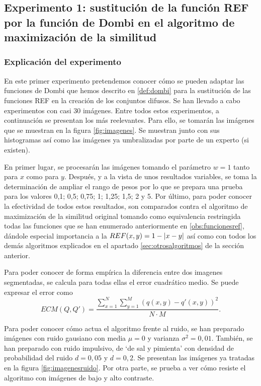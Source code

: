\subsection{Experimento 1: sustitución de la función REF por la función de Dombi en el algoritmo de maximización de la similitud}
\subsubsection{Explicación del experimento}
En este primer experimento pretendemos conocer cómo se pueden adaptar las funciones de Dombi que hemos descrito en \ref{def:dombi} para la sustitución de las funciones REF en la creación de los conjuntos difusos. Se han llevado a cabo experimentos con casi 30 imágenes. Entre todos estos experimentos, a continuación se presentan los más reelevantes. Para ello, se tomarán las imágenes que se muestran en la figura \ref{fig:imagenes}. Se muestran junto con sus histogramas así como las imágenes ya umbralizadas por parte de un experto (si existen). 

En primer lugar, se procesarán las imágenes tomando el parámetro $w=1$ tanto para $x$ como para $y$. Después, y a la vista de unos resultados variables, se toma la determinación de ampliar el rango de pesos por lo que se prepara una prueba para los valores 0,1; 0,5; 0,75; 1; 1,25; 1,5; 2 y 5. Por último, para poder conocer la efectividad de todos estos resultados, son comparados contra el algoritmo de maximización de la similitud original tomando como equivalencia restringida todas las funciones que se han enumerado anteriormente en \ref{obs:funcionesref}, dándole especial importancia a la \mbox{$REF(x,y)=1-\left\vert x-y\right\vert$} así como con todos los demás algoritmos explicados en el apartado \ref{sec:otrosalgoritmos} de la sección anterior. 

Para poder conocer de forma empírica la diferencia entre dos imagenes segmentadas, se calcula para todas ellas el error cuadrático medio. Se puede expresar el error como
$$ECM(Q, Q') = \frac{\sum_{x=1}^N\sum_{y=1}^M \left(q(x,y)-q'(x,y)\right)^2}{N\cdot M}.$$

Para poder conocer cómo actua el algoritmo frente al ruido, se han preparado imágenes con ruido gausiano con media $\mu=0$ y varianza $\sigma^2 = 0,01$. También, se han preparado con ruido impulsivo, de `de sal y pimienta' con densidad de probabilidad del ruido $d=0,05$ y $d=0,2$. Se presentan las imágenes ya tratadas en la figura \ref{fig:imagenesruido}. Por otra parte, se prueba a ver cómo resiste el algoritmo con imágenes de bajo y alto contraste. 

